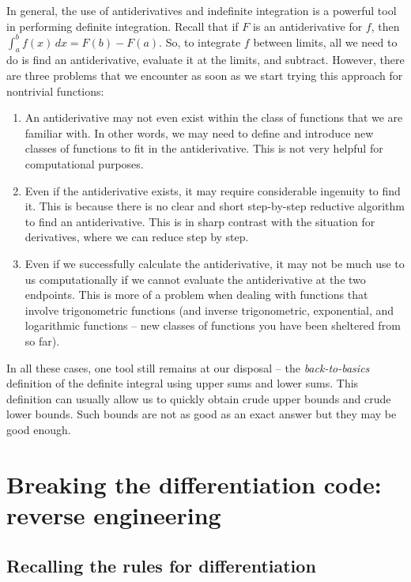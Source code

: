\documentclass{amsart}
\begin{document}
In general, the use of antiderivatives and indefinite integration is a
powerful tool in performing definite integration. Recall that if $F$
is an antiderivative for $f$, then $\int_a^b f(x) \, dx = F(b) -
F(a)$. So, to integrate $f$ between limits, all we need to do is find
an antiderivative, evaluate it at the limits, and subtract. However,
there are three problems that we encounter as soon as we start trying
this approach for nontrivial functions:

\begin{enumerate}
\item An antiderivative may not even exist within the class of
  functions that we are familiar with. In other words, we may need to
  define and introduce new classes of functions to fit in the
  antiderivative. This is not very helpful for computational purposes.
\item Even if the antiderivative exists, it may require considerable
  ingenuity to find it. This is because there is no clear and short
  step-by-step reductive algorithm to find an antiderivative. This is
  in sharp contrast with the situation for derivatives, where we can
  reduce step by step.
\item Even if we successfully calculate the antiderivative, it may not
  be much use to us computationally if we cannot evaluate the
  antiderivative at the two endpoints. This is more of a problem when
  dealing with functions that involve trigonometric functions (and
  inverse trigonometric, exponential, and logarithmic functions -- new
  classes of functions you have been sheltered from so far).
\end{enumerate}

In all these cases, one tool still remains at our disposal -- the {\em
back-to-basics} definition of the definite integral using upper sums
and lower sums. This definition can usually allow us to quickly obtain
crude upper bounds and crude lower bounds. Such bounds are not as good
as an exact answer but they may be good enough.

\section{Breaking the differentiation code: reverse engineering}

\subsection{Recalling the rules for differentiation}
\end{document}
